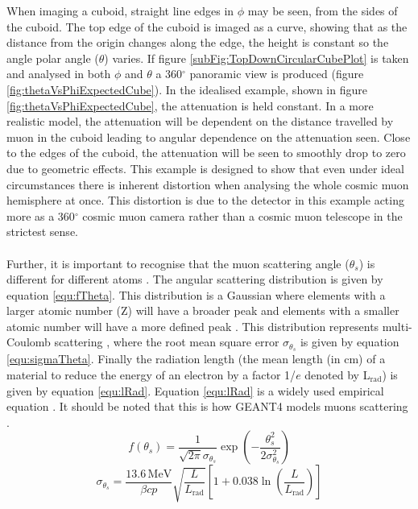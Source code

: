 When imaging a cuboid, straight line edges in $\phi$ may be seen, from the sides of the cuboid. The top edge of the cuboid is imaged as a curve, showing that as the distance from the origin changes along the edge, the height is constant so the angle polar angle ($\theta$) varies. If figure \ref{subFig:TopDownCircularCubePlot} is taken and analysed in both $\phi$ and $\theta$ a 360$^\circ$ panoramic view is produced (figure \ref{fig:thetaVsPhiExpectedCube}). In the idealised example, shown in figure \ref{fig:thetaVsPhiExpectedCube}, the attenuation is held constant. In a more realistic model, the attenuation will be dependent on the distance travelled by muon in the cuboid leading to angular dependence on the attenuation seen. Close to the edges of the cuboid, the attenuation will be seen to smoothly drop to zero due to geometric effects. This example is designed to show that even under ideal circumstances there is inherent distortion when analysing the whole cosmic muon hemisphere at once. This distortion is due to the detector in this example acting more as a 360$^\circ$ cosmic muon camera rather than a cosmic muon telescope in the strictest sense.
\\\\Further, it is important to recognise that the muon scattering angle ($\theta_s$) is different for different atoms \cite{Liu2020MuonScatteringZ} \cite{tripathy2016understanding}. The angular scattering distribution is given by equation \ref{equ:fTheta}. This distribution is a Gaussian where elements with a larger atomic number (Z) will have a broader peak and elements with a smaller atomic number will have a more defined peak \cite{Liu2020MuonScatteringZ}. This distribution represents multi-Coulomb scattering \cite{Liu2020MuonScatteringZ}, \cite{tripathy2016understanding} where the root mean square error $\sigma_\theta_s$ is given by equation \ref{equ:sigmaTheta}. Finally the radiation length (the mean length (in cm) of a material to reduce the energy of an electron by a factor 1/$e$ denoted by L$_{\textrm{rad}}$) is given by equation \ref{equ:lRad}. Equation \ref{equ:lRad} is a widely used empirical equation \cite{Liu2020MuonScatteringZ} \cite{tripathy2016understanding}. It should be noted that this is how GEANT4 models muons scattering \cite{tripathy2016understanding}.
\begin{equation}
    f(\theta_s) = \frac{1}{\sqrt{2\pi}\sigma_\theta_s} \exp\left({-\frac{\theta_s^2}{2\sigma_{\theta_s}^2}}\right)
    \label{equ:fTheta}
\end{equation}
\begin{equation}
    \sigma_\theta_s = \frac{13.6\,\textrm{MeV}}{\beta c p} \sqrt{\frac{L}{L_\textrm{rad}}}\left[1 + 0.038\ln{\left(\frac{L}{L_\textrm{rad}}\right)}\right]  
    \label{equ:sigmaTheta}
\end{equation}
